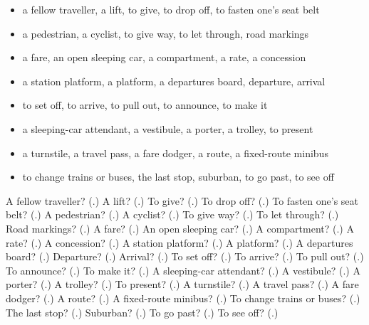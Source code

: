 \begin{itemize}
\raggedright
  \item a fellow traveller, a lift, to give, to drop off, to fasten one's seat belt
  \item a pedestrian, a cyclist, to give way, to let through, road markings
  \item a fare, an open sleeping car, a compartment, a rate, a concession
  \item a station platform, a platform, a departures board, departure, arrival
  \item to set off, to arrive, to pull out, to announce, to make it
  \item a sleeping-car attendant, a vestibule, a porter, a trolley, to present
  \item a turnstile, a travel pass, a fare dodger, a route, a fixed-route minibus
  \item to change trains or buses, the last stop, suburban, to go past, to see off
\end{itemize}

\begin{tcolorbox}[breakable,colback=teal!4,colframe=teal!35!black,title={Before you move on}]
A fellow traveller? (\textbf{}.) A lift? (\textbf{}.) To give? (\textbf{}.) To drop off? (\textbf{}.) To fasten one's seat belt? (\textbf{}.) A pedestrian? (\textbf{}.) A cyclist? (\textbf{}.) To give way? (\textbf{}.) To let through? (\textbf{}.) Road markings? (\textbf{}.) A fare? (\textbf{}.) An open sleeping car? (\textbf{}.) A compartment? (\textbf{}.) A rate? (\textbf{}.) A concession? (\textbf{}.) A station platform? (\textbf{}.) A platform? (\textbf{}.) A departures board? (\textbf{}.) Departure? (\textbf{}.) Arrival? (\textbf{}.) To set off? (\textbf{}.) To arrive? (\textbf{}.) To pull out? (\textbf{}.) To announce? (\textbf{}.) To make it? (\textbf{}.) A sleeping-car attendant? (\textbf{}.) A vestibule? (\textbf{}.) A porter? (\textbf{}.) A trolley? (\textbf{}.) To present? (\textbf{}.) A turnstile? (\textbf{}.) A travel pass? (\textbf{}.) A fare dodger? (\textbf{}.) A route? (\textbf{}.) A fixed-route minibus? (\textbf{}.) To change trains or buses? (\textbf{}.) The last stop? (\textbf{}.) Suburban? (\textbf{}.) To go past? (\textbf{}.) To see off? (\textbf{}.)
\end{tcolorbox}
